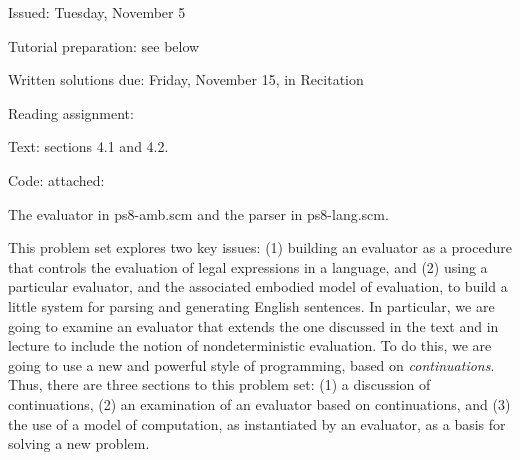 


\def\bigfbox#1{%
  \vtop{\vbox{\hrule%
     \hbox{\vrule\kern3pt%
 \vtop{\vbox{\kern3pt#1}\kern3pt}%
 \kern3pt\vrule}}%
 \hrule}}

\def\emptybox#1#2{\bigfbox{\vbox to #2{\hbox to #1 {\null}}}}	%




\noindent
Issued: Tuesday, November 5

\noindent
Tutorial preparation: see below

\noindent
Written solutions due: Friday, November 15, in Recitation


\begin{flushleft}
Reading assignment: 
\begin{tightlist}

\item Text: sections 4.1 and 4.2.
\item Code: attached:


The evaluator in {\cf ps8-amb.scm} and the parser in {\cf ps8-lang.scm}.

\end{tightlist}
\end{flushleft}

This problem set explores two key issues:  (1) building an evaluator as a
procedure that controls the evaluation of legal expressions in a
language, and (2) using a particular evaluator, and the associated embodied
model of evaluation, to build a little system for parsing and generating
English sentences.  In particular, we are going to examine an
evaluator that extends the one discussed in the text and in lecture to
include the notion of nondeterministic evaluation.   To do this, we
are going to use a new and powerful style of programming, based on {\it
continuations}.  Thus, there are three sections to this problem set: (1) a
discussion of continuations, (2) an examination of an evaluator based on
continuations, and (3) the use of a model of computation, as instantiated
by an evaluator, as a basis for solving a new problem.

